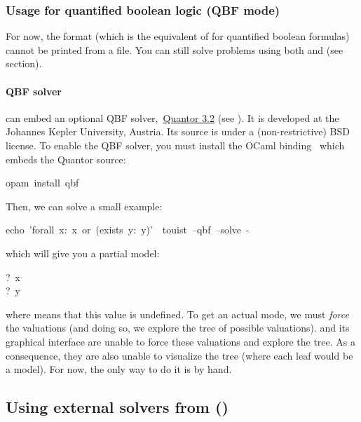 \subsubsection{Usage for quantified boolean logic (QBF mode)}\label{usage-qbf}%

\noindent For now, the  format (which is the equivalent of  for
quantified boolean formulas) cannot be printed from a \touist file.
You can still solve problems using both  and 
(see~ section).%

\paragraph{QBF solver}\label{usage-qbf-solver}%

\noindent{} can embed an optional QBF solver,~\href{http://fmv.jku.at/quantor/}{Quantor 3.2} (see
\cite{Biere2004}). It is developed at the Johannes Kepler University, Austria.
Its source is under a (non-restrictive) BSD license. To enable the QBF
solver, you must install the OCaml binding~\href{https://github.com/c-cube/ocaml-qbf}{} which embeds
the Quantor source:%
\begin{mdpre}%
\noindent{}opam~install~qbf%
\end{mdpre}\noindent Then, we can solve a small example:
\begin{mdpre}%
\noindent{}echo~'forall~x:~x~or~(exists~y:~y)'~\textbar{}~touist~--qbf~--solve~-%
\end{mdpre}\noindent which will give you a partial model:
\begin{mdpre}%
\noindent{}?~x\\
?~y%
\end{mdpre}\noindent where  means that this value is undefined. To get an actual mode, we
must \emph{force} the valuations (and doing so, we explore the tree of possible
valuations).  and its graphical interface are unable to force these
valuations and explore the tree. As a consequence, they are also unable
to visualize the tree (where each leaf would be a model). For now, the only
way to do it is by hand.

\subsection{Using external solvers from  ()}\label{sec-using-external-solvers-from-touist---solver}%

